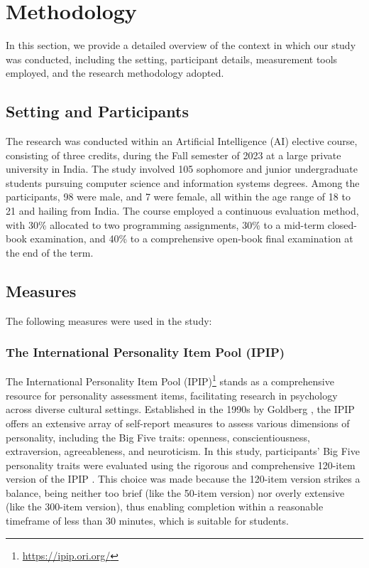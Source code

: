 \section{Methodology} \label{sec:method}

In this section, we provide a detailed overview of the context in which our study was conducted, including the setting, participant details, measurement tools employed, and the research methodology adopted.

\subsection{Setting and Participants}
The research was conducted within an Artificial Intelligence (AI) elective course, consisting of three credits, during the Fall semester of 2023 at a large private university in India. The study involved 105 sophomore and junior undergraduate students pursuing computer science and information systems degrees. Among the participants, 98 were male, and 7 were female, all within the age range of 18 to 21 and hailing from India. The course employed a continuous evaluation method, with 30\% allocated to two programming assignments, 30\% to a mid-term closed-book examination, and 40\% to a comprehensive open-book final examination at the end of the term.

\subsection{Measures}
The following measures were used in the study:
\subsubsection{The International Personality Item Pool (IPIP)}
The International Personality Item Pool (IPIP)\footnote{\url{https://ipip.ori.org/}} stands as a comprehensive resource for personality assessment items, facilitating research in psychology across diverse cultural settings. Established in the 1990s by Goldberg \cite{Goldberg}, the IPIP offers an extensive array of self-report measures to assess various dimensions of personality, including the Big Five traits: openness, conscientiousness, extraversion, agreeableness, and neuroticism. In this study, participants' Big Five personality traits were evaluated using the rigorous and comprehensive 120-item version of the IPIP \cite{JOHNSON201478}. This choice was made because the 120-item version strikes a balance, being neither too brief (like the 50-item version) nor overly extensive (like the 300-item version), thus enabling completion within a reasonable timeframe of less than 30 minutes, which is suitable for students.

